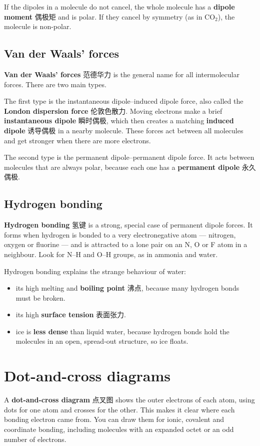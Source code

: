 \documentclass[11pt]{article}
\begin{document}
If the dipoles in a molecule do not cancel, the whole molecule has a \textbf{dipole moment} 偶极矩 and is polar. If they cancel by symmetry (as in $\text{CO}_2$), the molecule is non-polar.

\subsection*{Van der Waals' forces}

\textbf{Van der Waals' forces} 范德华力 is the general name for all intermolecular forces. There are two main types.

The first type is the instantaneous dipole–induced dipole force, also called the \textbf{London dispersion force} 伦敦色散力. Moving electrons make a brief \textbf{instantaneous dipole} 瞬时偶极, which then creates a matching \textbf{induced dipole} 诱导偶极 in a nearby molecule. These forces act between all molecules and get stronger when there are more electrons.

The second type is the permanent dipole–permanent dipole force. It acts between molecules that are always polar, because each one has a \textbf{permanent dipole} 永久偶极.

\subsection*{Hydrogen bonding}

\textbf{Hydrogen bonding} 氢键 is a strong, special case of permanent dipole forces. It forms when hydrogen is bonded to a very electronegative atom — nitrogen, oxygen or fluorine — and is attracted to a lone pair on an N, O or F atom in a neighbour. Look for N–H and O–H groups, as in ammonia and water.

Hydrogen bonding explains the strange behaviour of water:

\begin{itemize}
\item its high melting and \textbf{boiling point} 沸点, because many hydrogen bonds must be broken.

\item its high \textbf{surface tension} 表面张力.

\item ice is \textbf{less dense} than liquid water, because hydrogen bonds hold the molecules in an open, spread-out structure, so ice floats.

\end{itemize}

\section*{Dot-and-cross diagrams}

A \textbf{dot-and-cross diagram} 点叉图 shows the outer electrons of each atom, using dots for one atom and crosses for the other. This makes it clear where each bonding electron came from. You can draw them for ionic, covalent and coordinate bonding, including molecules with an expanded octet or an odd number of electrons.
\end{document}
